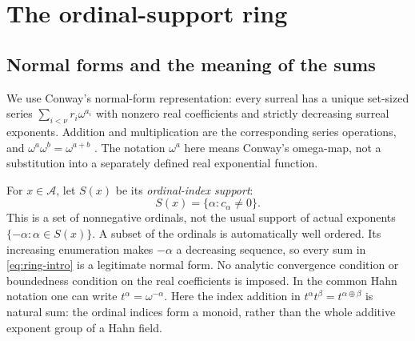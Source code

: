 \documentclass[11pt,letterpaper]{article}
\theoremstyle{definition}
\theoremstyle{remark}
\newcommand{\A}{\mathscr{A}}
\newcommand{\ns}{\mathbin{\oplus}}
\begin{document}
\section{The ordinal-support ring}

\subsection{Normal forms and the meaning of the sums}
We use Conway's normal-form representation: every surreal has a unique
set-sized series \(\sum_{i<\nu}r_i\omega^{a_i}\) with nonzero real
coefficients and strictly decreasing surreal exponents. Addition and
multiplication are the corresponding series operations, and
\(\omega^a\omega^b=\omega^{a+b}\)
\cite[Sections~8--10]{Berarducci}. The notation \(\omega^a\) here
means Conway's omega-map, not a substitution into a separately defined
real exponential function.

For \(x\in\A\), let \(S(x)\) be its \emph{ordinal-index support}:
\[
 S(x)=\{\alpha:c_\alpha\ne0\}.
\]
This is a set of nonnegative ordinals, not the usual support of actual
exponents \(\{-\alpha:\alpha\in S(x)\}\). A subset of the ordinals
is automatically well ordered. Its increasing enumeration makes
\(-\alpha\) a decreasing sequence, so every sum in
\eqref{eq:ring-intro} is a legitimate normal form. No analytic convergence
condition or boundedness condition on the real coefficients is imposed.
In the common Hahn notation one can write \(t^\alpha=\omega^{-\alpha}\).
Here the index addition in \(t^\alpha t^\beta=t^{\alpha\ns\beta}\)
is natural sum: the ordinal indices form a monoid, rather than the whole
additive exponent group of a Hahn field.
\end{document}
